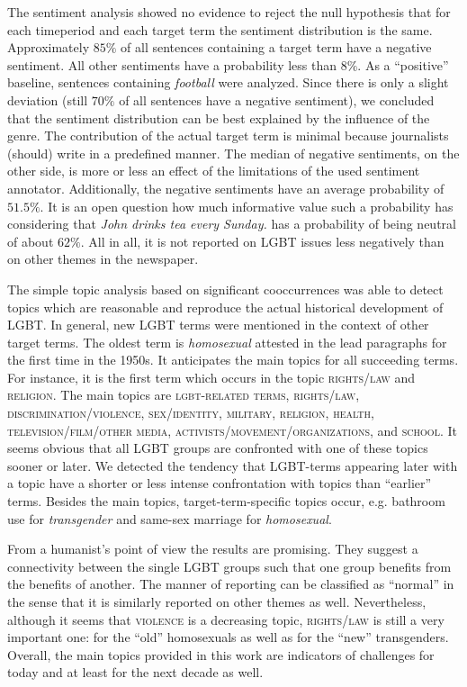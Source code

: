 \documentclass[10pt,a4paper,twocolumn]{scrartcl}
\begin{document}
The sentiment analysis showed no evidence to reject the null hypothesis that for each timeperiod and each target term the sentiment distribution is the same. Approximately $85\%$ of all sentences containing a target term have a negative sentiment. All other sentiments have a probability less than $8\%$. As a ``positive'' baseline, sentences containing \textit{football} were analyzed. Since there is only a slight deviation (still $70\%$ of all sentences have a negative sentiment), we concluded that the sentiment distribution can be best explained by the influence of the genre. The contribution of the actual target term is minimal because journalists (should) write in a predefined manner. The median of negative sentiments, on the other side, is more or less an effect of the limitations of the used sentiment annotator. Additionally, the negative sentiments have an average probability of $51.5\%$. It is an open question how much informative value such a probability has considering that \textit{John drinks tea every Sunday.} has a probability of being neutral of about $62\%$. All in all, it is not reported on LGBT issues less negatively than on other themes in the newspaper.

The simple topic analysis based on significant cooccurrences was able to detect topics which are reasonable and reproduce the actual historical development of LGBT. In general, new LGBT terms were mentioned in the context of other target terms. The oldest term is \textit{homosexual} attested in the lead paragraphs for the first time in the 1950s. It anticipates the main topics for all succeeding terms. For instance, it is the first term which occurs in the topic \textsc{rights/law} and \textsc{religion}. The main topics are  \textsc{lgbt-related terms}, \textsc{rights/law}, \textsc{discrimination/violence}, \textsc{sex/identity}, \textsc{military}, \textsc{religion}, \textsc{health}, \textsc{television/film/other media}, \textsc{activists/movement/organizations}, and \textsc{school}. It seems obvious that all LGBT groups are confronted with one of these topics sooner or later. We detected the tendency that LGBT-terms appearing later with a topic have a shorter or less intense confrontation with topics than ``earlier'' terms. Besides the main topics, target-term-specific topics occur, e.g. bathroom use for \textit{transgender} and same-sex marriage for \textit{homosexual}. 

From a humanist's point of view the results are promising. They suggest a connectivity between the single LGBT groups such that one group benefits from the benefits of another. The manner of reporting can be classified as ``normal'' in the sense that it is similarly reported on other themes as well. Nevertheless, although it seems that \textsc{violence} is a decreasing topic, \textsc{rights/law} is still a very important one: for the ``old'' homosexuals as well as for the ``new'' transgenders. Overall, the main topics provided in this work are indicators of challenges for today and at least for the next decade as well.
\end{document}
